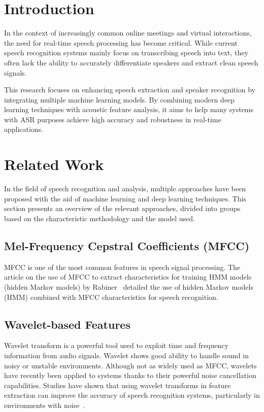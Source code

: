 \documentclass[conference]{IEEEtran}
\begin{document}
\section{Introduction}
In the context of increasingly common online meetings and virtual interactions,
the need for real-time speech processing has become critical.
While current speech recognition systems mainly focus on transcribing speech into text,
they often lack the ability to accurately differentiate speakers and extract clean speech signals.

This research focuses on enhancing speech extraction and speaker recognition by
integrating multiple machine learning models. By combining modern deep learning
techniques with acoustic feature analysis, it aims to help many systems with ASR
purposes achieve high accuracy and robustness in real-time applications.
\section{Related Work}

In the field of speech recognition and analysis, multiple approaches have been proposed with the aid of machine learning and deep learning techniques. This section presents an overview of the relevant approaches, divided into groups based on the characteristic methodology and the model used.

\subsection{Mel-Frequency Cepstral Coefficients (MFCC)}

MFCC is one of the most common features in speech signal processing. The article on the use of MFCC to extract characteristics for training HMM models (hidden Markov models) by Rabiner~\cite{rabiner1989tutorial} detailed the use of hidden Markov models (HMM) combined with MFCC characteristics for speech recognition.

\subsection{Wavelet-based Features}

Wavelet transform is a powerful tool used to exploit time and frequency information from audio signals. Wavelet shows good ability to handle sound in noisy or unstable environments. Although not as widely used as MFCC, wavelets have recently been applied to systems thanks to their powerful noise cancellation capabilities. Studies have shown that using wavelet transforms in feature extraction can improve the accuracy of speech recognition systems, particularly in environments with noise~\cite{gupta2003robust, wang2008robust}.
\end{document}
